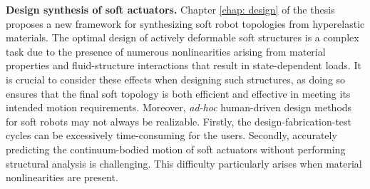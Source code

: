 


\textbf{Design synthesis of soft actuators.} Chapter \ref{chap: design} of the thesis proposes a new framework for synthesizing soft robot topologies from hyperelastic materials. The optimal design of actively deformable soft structures is a complex task due to the presence of numerous nonlinearities arising from material properties and fluid-structure interactions that result in state-dependent loads. It is crucial to consider these effects when designing such structures, as doing so ensures that the final soft topology is both efficient and effective in meeting its intended motion requirements. Moreover, \emph{ad-hoc} human-driven design methods for soft robots may not always be realizable. Firstly, the design-fabrication-test cycles can be excessively time-consuming for the users. Secondly, accurately predicting the continuum-bodied motion of soft actuators without performing structural analysis is challenging. This difficulty particularly arises when material nonlinearities are present. %

